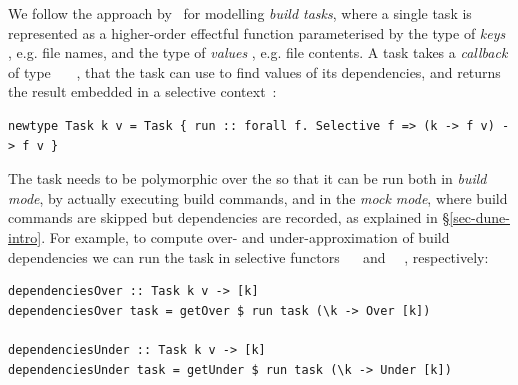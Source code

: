 We follow the approach by~\citet{mokhov2018build} for modelling \emph{build
tasks}, where a single task is represented as a higher-order effectful function
parameterised by the type of \emph{keys} , e.g. file names, and the type
of \emph{values} , e.g. file contents. A task takes a \emph{callback} of
type ~\hs{->}~~, that the task can use to find values of its
dependencies, and returns the result embedded in a selective context~:

\vspace{1mm}
\begin{verbatim}
newtype Task k v = Task { run :: forall f. Selective f => (k -> f v) -> f v }
\end{verbatim}
\vspace{1mm}

\noindent
The task needs to be polymorphic over the  so that it can be run both in
\emph{build mode}, by actually executing build commands, and in the \emph{mock
mode}, where build commands are skipped but dependencies are recorded, as
explained in \S\ref{sec-dune-intro}. For example, to compute over- and
under-approximation of build dependencies we can run the task in selective
functors ~\hs{=}~ and ~\hs{=}~, respectively:

\vspace{1mm}
\begin{verbatim}
dependenciesOver :: Task k v -> [k]
dependenciesOver task = getOver $ run task (\k -> Over [k])

dependenciesUnder :: Task k v -> [k]
dependenciesUnder task = getUnder $ run task (\k -> Under [k])
\end{verbatim}
\vspace{1mm}

